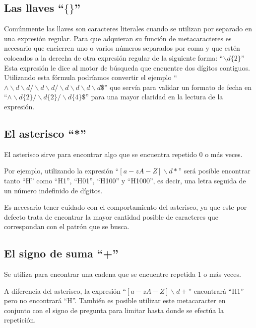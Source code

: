 \subsection{Las llaves ``$\{\}$''}

Comúnmente las llaves son caracteres literales cuando se utilizan por separado en una expresión regular.
Para que adquieran su función de metacaracteres
es necesario que encierren uno o varios números separados por coma
y que estén colocados a la derecha de otra expresión regular de la siguiente forma:
``$\backslash d\{2\}$'' Esta expresión le dice al motor de búsqueda que encuentre dos dígitos contiguos.
Utilizando esta fórmula podríamos convertir el ejemplo ``$\wedge\backslash d\backslash d/\backslash d\backslash d/\backslash d\backslash d\backslash d\backslash d\$$'' que servía para validar un formato de fecha
en ``$\wedge\backslash d\{2\}/\backslash d\{2\}/\backslash d\{4\}\$$'' para una mayor claridad en la lectura de la expresión.

\subsection{El asterisco ``*''}

El asterisco sirve para encontrar algo que se encuentra repetido 0 o más veces.

Por ejemplo,
utilizando la expresión ``$[a-zA-Z]\backslash d*$'' será posible encontrar tanto ``H'' como ``H1'', ``H01'', ``H100'' y ``H1000'',
es decir, una letra seguida de un número indefinido de dígitos.

Es necesario tener cuidado con el comportamiento del asterisco,
ya que este por defecto
trata de encontrar la mayor cantidad posible de caracteres que correspondan
con el patrón que se busca.

\subsection{El signo de suma ``+''}

Se utiliza para encontrar una cadena que se encuentre repetida 1 o más veces.

A diferencia del asterisco,
la expresión ``$[a-zA-Z]\backslash d+$'' encontrará ``H1'' pero no encontrará ``H''.
También es posible utilizar este metacaracter en conjunto con el signo de pregunta para limitar hasta donde se efectúa la repetición.
